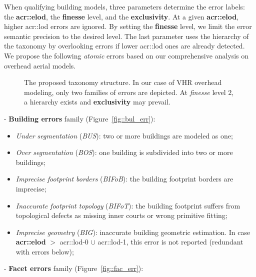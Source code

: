 \documentclass[conference]{IEEEtran}
\begin{document}
    When qualifying building models, three parameters determine the error labels: the \textbf{\acrfull{acr::elod}}, the \textbf{finesse} level, and the \textbf{exclusivity}. At a given \textbf{\acrshort{acr::elod}}, higher \acrshort{acr::lod} errors are ignored. By setting the \textbf{finesse} level, we limit the error semantic precision to the desired level. The last parameter uses the hierarchy of the taxonomy by overlooking errors if lower \acrshort{acr::lod} ones are already detected. 	We propose the following \textit{atomic} errors based on our comprehensive analysis on overhead aerial models.\\
	\begin{figure}
        \begin{center}
            
            \vspace{-1.1cm}
            \caption{\label{fig::taxonomy} The proposed taxonomy structure. In our case of VHR overhead modeling, only two families of errors are depicted. At \textit{finesse} level $2$, a hierarchy exists and \textbf{exclusivity} may prevail.}
        \end{center}
    \end{figure}
- \textbf{Building errors} family (Figure~\ref{fig::bul_err}):
        \begin{itemize}
        	\item \textit{Under segmentation} (\textit{BUS}): two or more buildings are modeled as one;
            \item \textit{Over segmentation} (\textit{BOS}): one building is subdivided into two or more buildings;
            \item \textit{Imprecise footprint borders} (\textit{BIFoB}): the building footprint borders are imprecise;
            \item \textit{Inaccurate footprint topology} (\textit{BIFoT}): the building footprint suffers from topological defects as missing inner courts or wrong primitive fitting;
            \item \textit{Imprecise geometry} (\textit{BIG}): inaccurate building geometric estimation. In case \textbf{\acrshort{acr::elod}} $>$ \acrshort{acr::lod}-0 $\cup$ \acrshort{acr::lod}-1, this error is not reported (redundant with errors below);
        \end{itemize}
- \textbf{Facet errors} family (Figure~\ref{fig::fac_err}):
\end{document}
